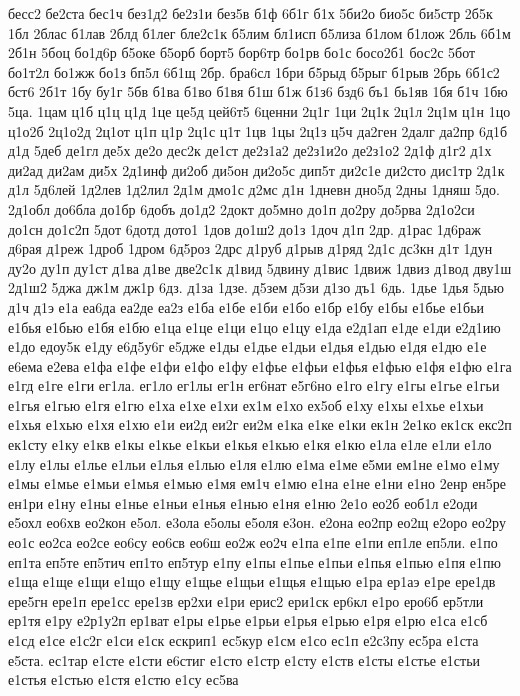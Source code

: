 {бесс2
бе2ста
бес1ч
без1д2
бе2з1и
без5в
б1ф
6б1г
б1х
5би2о
био5с
би5стр
2б5к
1бл
2блас
б1лав
2блд
б1лег
бле2с1к
б5лим
бл1исп
б5лиза
б1лом
б1лож
2бль
6б1м
2б1н
5боц
бо1д6р
б5оке
б5орб
борт5
бор6тр
бо1рв
бо1с
босо2б1
бос2с
5бот
бо1т2л
бо1жж
бо1з
бп5л
6б1щ
2бр.
бра6сл
1бри
б5рыд
б5рыг
б1рыв
2брь
6б1с2
бст6
2б1т
1бу
бу1г
5бв
б1ва
б1во
б1вя
б1ш
б1ж
б1з6
бзд6
бъ1
бь1яв
1бя
б1ч
1бю
5ца.
1цам
ц1б
ц1ц
ц1д
1це
це5д
цей6т5
6ценни
2ц1г
1ци
2ц1к
2ц1л
2ц1м
ц1н
1цо
ц1о2б
2ц1о2д
2ц1от
ц1п
ц1р
2ц1с
ц1т
1цв
1цы
2ц1з
ц5ч
да2ген
2далг
да2пр
6д1б
д1д
5деб
де1гл
де5х
де2о
дес2к
де1ст
де2з1а2
де2з1и2о
де2з1о2
2д1ф
д1г2
д1х
ди2ад
ди2ам
ди5х
2д1инф
ди2об
ди5он
ди2о5с
дип5т
ди2с1е
ди2сто
дис1тр
2д1к
д1л
5д6лей
1д2лев
1д2лил
2д1м
дмо1с
д2мс
д1н
1дневн
дно5д
2дны
1дняш
5до.
2д1обл
до6бла
до1бр
6добъ
до1д2
2докт
до5мно
до1п
до2ру
до5рва
2д1о2си
до1сн
до1с2п
5дот
6дотд
дото1
1дов
до1ш2
до1з
1доч
д1п
2др.
д1рас
1д6раж
д6рая
д1реж
1дроб
1дром
6д5роз
2дрс
д1руб
д1рыв
д1ряд
2д1с
дс3кн
д1т
1дун
ду2о
ду1п
ду1ст
д1ва
д1ве
две2с1к
д1вид
5двину
д1вис
1движ
1двиз
д1вод
дву1ш
2д1ш2
5джа
дж1м
дж1р
6дз.
д1за
1дзе.
д5зем
д5зи
д1зо
дъ1
6дь.
1дье
1дья
5дью
д1ч
д1э
е1а
еа6да
еа2де
еа2з
е1ба
е1бе
е1би
е1бо
е1бр
е1бу
е1бы
е1бье
е1бьи
е1бья
е1бью
е1бя
е1бю
е1ца
е1це
е1ци
е1цо
е1цу
е1да
е2д1ап
е1де
е1ди
е2д1ию
е1до
едоу5к
е1ду
е6д5у6г
е5дже
е1ды
е1дье
е1дьи
е1дья
е1дью
е1дя
е1дю
е1е
е6ема
е2ева
е1фа
е1фе
е1фи
е1фо
е1фу
е1фье
е1фьи
е1фья
е1фью
е1фя
е1фю
е1га
е1гд
е1ге
е1ги
ег1ла.
ег1ло
ег1лы
ег1н
ег6нат
е5г6но
е1го
е1гу
е1гы
е1гье
е1гьи
е1гья
е1гью
е1гя
е1гю
е1ха
е1хе
е1хи
ех1м
е1хо
ех5об
е1ху
е1хы
е1хье
е1хьи
е1хья
е1хью
е1хя
е1хю
е1и
еи2д
еи2г
еи2м
е1ка
е1ке
е1ки
ек1н
2е1ко
ек1ск
екс2п
ек1сту
е1ку
е1кв
е1кы
е1кье
е1кьи
е1кья
е1кью
е1кя
е1кю
е1ла
е1ле
е1ли
е1ло
е1лу
е1лы
е1лье
е1льи
е1лья
е1лью
е1ля
е1лю
е1ма
е1ме
е5ми
ем1не
е1мо
е1му
е1мы
е1мье
е1мьи
е1мья
е1мью
е1мя
ем1ч
е1мю
е1на
е1не
е1ни
е1но
2енр
ен5ре
ен1ри
е1ну
е1ны
е1нье
е1ньи
е1нья
е1нью
е1ня
е1ню
2е1о
ео2б
еоб1л
е2оди
е5охл
ео6хв
ео2кон
е5ол.
е3ола
е5олы
е5оля
е3он.
е2она
ео2пр
ео2щ
е2оро
ео2ру
ео1с
ео2са
ео2се
ео6су
ео6св
ео6ш
ео2ж
ео2ч
е1па
е1пе
е1пи
еп1ле
еп5ли.
е1по
еп1та
еп5те
еп5тич
еп1то
еп5тур
е1пу
е1пы
е1пье
е1пьи
е1пья
е1пью
е1пя
е1пю
е1ща
е1ще
е1щи
е1що
е1щу
е1щье
е1щьи
е1щья
е1щью
е1ра
ер1аэ
е1ре
ере1дв
ере5гн
ере1п
ере1сс
ере1зв
ер2хи
е1ри
ерис2
ери1ск
ер6кл
е1ро
еро6б
ер5тли
ер1тя
е1ру
е2р1у2п
ер1ват
е1ры
е1рье
е1рьи
е1рья
е1рью
е1ря
е1рю
е1са
е1сб
е1сд
е1се
е1с2г
е1си
е1ск
ескрип1
ес5кур
е1см
е1со
ес1п
е2с3пу
ес5ра
е1ста
е5ста.
ес1тар
е1сте
е1сти
е6стиг
е1сто
е1стр
е1сту
е1ств
е1сты
е1стье
е1стьи
е1стья
е1стью
е1стя
е1стю
е1су
ес5ва
}
